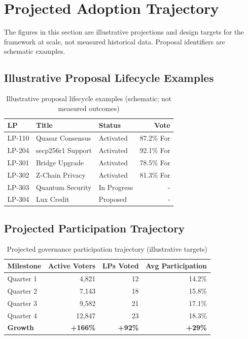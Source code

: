 \section{Projected Adoption Trajectory}

The figures in this section are illustrative projections and design targets for
the framework at scale, not measured historical data. Proposal identifiers are
schematic examples.

\subsection{Illustrative Proposal Lifecycle Examples}

\begin{table}[h]
\centering
\begin{tabular}{@{}lllr@{}}
\toprule
\textbf{LP} & \textbf{Title} & \textbf{Status} & \textbf{Vote} \\ \midrule
LP-110 & Quasar Consensus & Activated & 87.2\% For \\
LP-204 & secp256r1 Support & Activated & 92.1\% For \\
LP-301 & Bridge Upgrade & Activated & 78.5\% For \\
LP-302 & Z-Chain Privacy & Activated & 81.3\% For \\
LP-303 & Quantum Security & In Progress & - \\
LP-304 & Lux Credit & Proposed & - \\ \bottomrule
\end{tabular}
\caption{Illustrative proposal lifecycle examples (schematic; not measured outcomes)}
\end{table}

\subsection{Projected Participation Trajectory}

\begin{table}[h]
\centering
\begin{tabular}{@{}lrrr@{}}
\toprule
\textbf{Milestone} & \textbf{Active Voters} & \textbf{LPs Voted} & \textbf{Avg Participation} \\ \midrule
Quarter 1 & 4,821 & 12 & 14.2\% \\
Quarter 2 & 7,143 & 18 & 15.8\% \\
Quarter 3 & 9,582 & 21 & 17.1\% \\
Quarter 4 & 12,847 & 23 & 18.3\% \\ \midrule
\textbf{Growth} & \textbf{+166\%} & \textbf{+92\%} & \textbf{+29\%} \\ \bottomrule
\end{tabular}
\caption{Projected governance participation trajectory (illustrative targets)}
\end{table}

